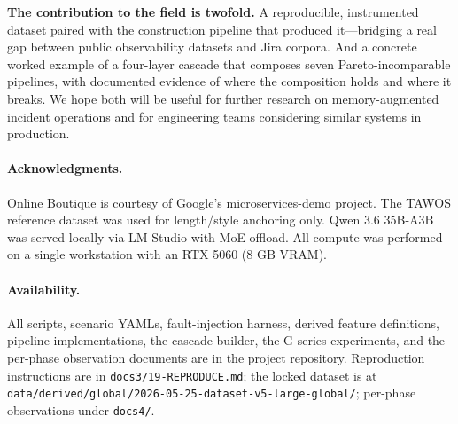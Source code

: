 \textbf{The contribution to the field is twofold.} A reproducible, instrumented dataset paired with the construction pipeline that produced it---bridging a real gap between public observability datasets and Jira corpora. And a concrete worked example of a four-layer cascade that composes seven Pareto-incomparable pipelines, with documented evidence of where the composition holds and where it breaks. We hope both will be useful for further research on memory-augmented incident operations and for engineering teams considering similar systems in production.

\paragraph{Acknowledgments.} Online Boutique is courtesy of Google's microservices-demo project. The TAWOS reference dataset was used for length/style anchoring only. Qwen 3.6 35B-A3B was served locally via LM Studio with MoE offload. All compute was performed on a single workstation with an RTX 5060 (8 GB VRAM).

\paragraph{Availability.} All scripts, scenario YAMLs, fault-injection harness, derived feature definitions, pipeline implementations, the cascade builder, the G-series experiments, and the per-phase observation documents are in the project repository. Reproduction instructions are in \texttt{docs3/19-REPRODUCE.md}; the locked dataset is at \texttt{data/derived/global/2026-05-25-dataset-v5-large-global/}; per-phase observations under \texttt{docs4/}.
